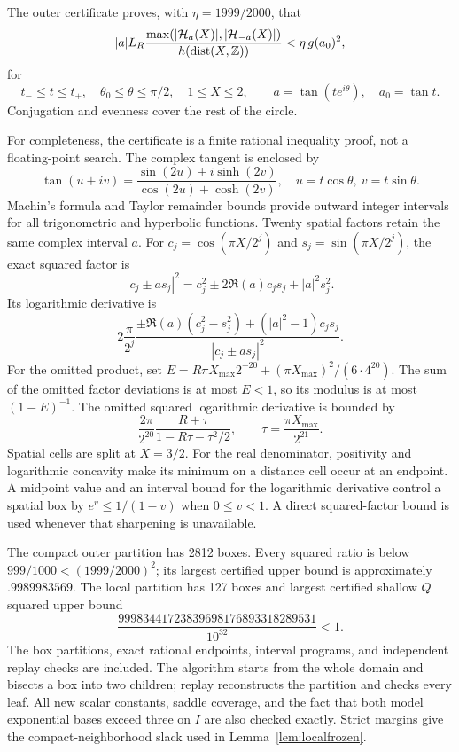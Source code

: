 \documentclass[11pt,a4paper]{article}
\theoremstyle{remark}\newtheorem*{ednote}{Editorial note (ProveIt, 2026-10-01)}
\newcommand{\HH}{\mathcal H}\newcommand{\GG}{\mathcal G}
\begin{document}
The outer certificate proves, with $\eta=1999/2000$, that
\begin{equation}\label{eq:outer}
 |a|L_R\frac{\max(|\HH_a(X)|,|\HH_{-a}(X)|)}{h(\operatorname{dist}(X,\Z))}
 <\eta\,g(a_0)^2,
\end{equation}
for
\[
 t_-\le t\le t_+,\quad \theta_0\le\theta\le\pi/2,\quad
 1\le X\le2,\qquad a=\tan(te^{i\theta}),\quad a_0=\tan t.
\]
Conjugation and evenness cover the rest of the circle.

For completeness, the certificate is a finite rational inequality proof, not a floating-point search. The complex tangent is enclosed by
\[
 \tan(u+iv)=\frac{\sin(2u)+i\sinh(2v)}{\cos(2u)+\cosh(2v)},
 \quad u=t\cos\theta,\ v=t\sin\theta.
\]
Machin's formula and Taylor remainder bounds provide outward integer intervals for all trigonometric and hyperbolic functions. Twenty spatial factors retain the same complex interval $a$. For $c_j=\cos(\pi X/2^j)$ and $s_j=\sin(\pi X/2^j)$, the exact squared factor is
\[
 |c_j\pm as_j|^2=c_j^2\pm2\Re(a)c_js_j+|a|^2s_j^2.
\]
Its logarithmic derivative is
\[
 2\frac{\pi}{2^j}
 \frac{\pm\Re(a)(c_j^2-s_j^2)+(|a|^2-1)c_js_j}{|c_j\pm as_j|^2}.
\]
For the omitted product, set $E=R\pi X_{\max}2^{-20}+(\pi X_{\max})^2/(6\cdot4^{20})$. The sum of the omitted factor deviations is at most $E<1$, so its modulus is at most $(1-E)^{-1}$. The omitted squared logarithmic derivative is bounded by
\[
 \frac{2\pi}{2^{20}}\frac{R+\tau}{1-R\tau-\tau^2/2},
 \qquad \tau=\frac{\pi X_{\max}}{2^{21}}.
\]
Spatial cells are split at $X=3/2$. For the real denominator, positivity and logarithmic concavity make its minimum on a distance cell occur at an endpoint. A midpoint value and an interval bound for the logarithmic derivative control a spatial box by $e^v\le1/(1-v)$ when $0\le v<1$. A direct squared-factor bound is used whenever that sharpening is unavailable.

The compact outer partition has 2812 boxes. Every squared ratio is below $999/1000<(1999/2000)^2$; its largest certified upper bound is approximately $.9989983569$. The local partition has 127 boxes and largest certified shallow $Q$ squared upper bound
\[
 \frac{99983441723839698176893318289531}{10^{32}}<1.
\]
The box partitions, exact rational endpoints, interval programs, and independent replay checks are included. The algorithm starts from the whole domain and bisects a box into two children; replay reconstructs the partition and checks every leaf. All new scalar constants, saddle coverage, and the fact that both model exponential bases exceed three on $I$ are also checked exactly. Strict margins give the compact-neighborhood slack used in Lemma~\ref{lem:localfrozen}.
\end{document}
